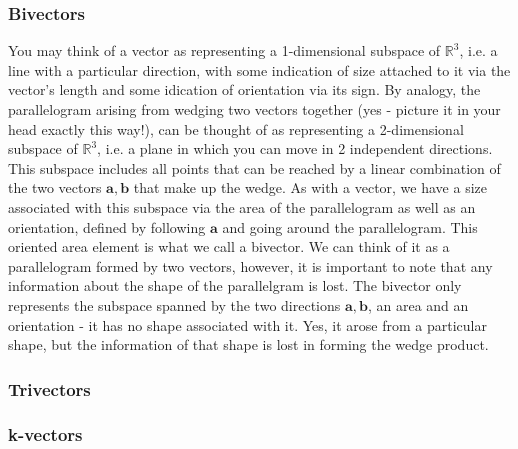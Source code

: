 \subsubsection{Bivectors}
You may think of a vector as representing a 1-dimensional subspace of $\mathbb{R}^3$, i.e. a line with a particular direction, with some indication of size attached to it via the vector's length and some idication of orientation via its sign. By analogy, the parallelogram arising from wedging two vectors together (yes - picture it in your head exactly this way!), can be thought of as representing a 2-dimensional subspace of $\mathbb{R}^3$, i.e. a plane in which you can move in 2 independent directions. This subspace includes all points that can be reached by a linear combination of the two vectors $\mathbf{a,b}$ that make up the wedge. As with a vector, we have a size associated with this subspace via the area of the parallelogram as well as an orientation, defined by following $\mathbf{a}$ and going around the parallelogram. This oriented area element is what we call a bivector. We can think of it as a parallelogram formed by two vectors, however, it is important to note that any information about the shape of the parallelgram is lost. The bivector only represents the subspace spanned by the two directions $\mathbf{a,b}$, an area and an orientation - it has no shape associated with it. Yes, it arose from a particular shape, but the information of that shape is lost in forming the wedge product.

\subsubsection{Trivectors}

\subsubsection{k-vectors}



\begin{comment}

resources:
https://en.wikipedia.org/wiki/Exterior_algebra
https://de.wikipedia.org/wiki/Gra%

https://math.wikia.org/wiki/Dot_product
https://math.wikia.org/wiki/Wedge_product
https://math.wikia.org/wiki/Cross_product
https://math.wikia.org/wiki/Pseudovector
https://math.wikia.org/wiki/Scalar_triple_product
https://math.wikia.org/wiki/Vector_triple_product

\end{comment}